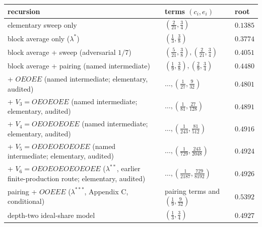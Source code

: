 \documentclass[11pt,a4paper]{article}
\begin{document}
\begingroup\small

\begin{longtable}[]{@{}
  >{\raggedright\arraybackslash}p{}
  >{\raggedright\arraybackslash}p{}
  >{\raggedright\arraybackslash}p{}@{}}
\toprule\noalign{}
\begin{minipage}[b]{\linewidth}\raggedright
recursion
\end{minipage} & \begin{minipage}[b]{\linewidth}\raggedright
terms \((c_i,e_i)\)
\end{minipage} & \begin{minipage}[b]{\linewidth}\raggedright
root
\end{minipage} \\
\midrule\noalign{}
\endhead
\bottomrule\noalign{}
\endfoot
\bottomrule\noalign{}
\endlastfoot
elementary sweep only & \((\tfrac2{21},\tfrac34)\) & \(0.1385\) \\
block average only (\(\lambda^*\)) & \((\tfrac13,\tfrac38)\) &
\(0.3774\) \\
block average + sweep (adversarial \(1/7\)) &
\((\tfrac5{21},\tfrac38),(\tfrac2{21},\tfrac34)\) & \(0.4051\) \\
block average + pairing (named intermediate) &
\((\tfrac19,\tfrac38),(\tfrac29,\tfrac34)\) & \(0.4480\) \\
+ \(OEOEE\) (named intermediate; elementary, audited) &
\(\ldots,(\tfrac1{27},\tfrac9{32})\) & \(0.4801\) \\
+ \(V_3=OEOEOEE\) (named intermediate; elementary, audited) &
\(\ldots,(\tfrac1{81},\tfrac{27}{128})\) & \(0.4891\) \\
+ \(V_4=OEOEOEOEE\) (named intermediate; elementary, audited) &
\(\ldots,(\tfrac1{243},\tfrac{81}{512})\) & \(0.4916\) \\
+ \(V_5=OEOEOEOEOEE\) (named intermediate; elementary, audited) &
\(\ldots,(\tfrac1{729},\tfrac{243}{2048})\) & \(0.4924\) \\
+ \(V_6=OEOEOEOEOEOEE\) (\(\lambda^{**}\), earlier finite-production
route; elementary, audited) &
\(\ldots,(\tfrac1{2187},\tfrac{729}{8192})\) & \(0.4926\) \\
pairing + \(OOEEE\) (\(\lambda^{***}\), Appendix C, conditional) &
pairing terms and \((\tfrac19,\tfrac9{32})\) & \(0.5392\) \\
depth-two ideal-share model & \((\tfrac13,\tfrac34)\) & \(0.4927\) \\

\end{longtable}
\end{document}
